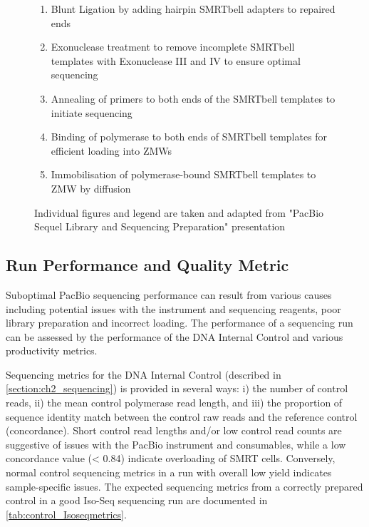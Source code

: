 \begin{figure}[!htp]
{\begin{enumerate}
			\item Blunt Ligation by adding hairpin SMRTbell adapters to repaired ends
			\item Exonuclease treatment to remove incomplete SMRTbell templates with Exonuclease III and IV to ensure optimal sequencing
			\item Annealing of primers to both ends of the SMRTbell templates to initiate sequencing 
			\item Binding of polymerase to both ends of SMRTbell templates for efficient loading into ZMWs
			\item Immobilisation of polymerase-bound SMRTbell templates to ZMW by diffusion
			\\
		\end{enumerate} 
		Individual figures and legend are taken and adapted from "PacBio Sequel Library and Sequencing Preparation" presentation
	}
	\label{fig:isoseq_labworkflow}
\end{figure}

\clearpage
\subsection{Run Performance and Quality Metric}
\label{sec: Isoseq_run_performance}
Suboptimal PacBio sequencing performance can result from various causes including potential issues with the instrument and sequencing reagents, poor library preparation and incorrect loading. The performance of a sequencing run can be assessed by the performance of the DNA Internal Control and various productivity metrics. 

Sequencing metrics for the DNA Internal Control (described in \cref{section:ch2_sequencing}) is provided in several ways: i) the number of control reads, ii) the mean control polymerase read length, and iii) the proportion of sequence identity match between the control raw reads and the reference control (concordance). Short control read lengths and/or low control read counts are suggestive of issues with the PacBio instrument and consumables, while a low concordance value (< 0.84) indicate overloading of SMRT cells. Conversely, normal control sequencing metrics in a run with overall low yield indicates sample-specific issues. The expected sequencing metrics from a correctly prepared control in a good Iso-Seq sequencing run are documented in \cref{tab:control_Isoseqmetrics}. 

